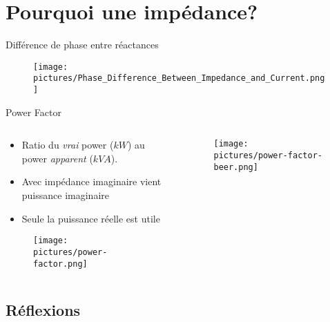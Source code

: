 
\section{Pourquoi une impédance?}

\begin{frame}{Différence de phase entre réactances}
    \begin{figure}
        \centering
        \texttt{[image: pictures/Phase\_Difference\_Between\_Impedance\_and\_Current.png]}
    \end{figure}
\end{frame}

\begin{frame}{Power Factor}
    \begin{columns}
        \begin{column}{0.5\textwidth}
            \begin{itemize}
                \item Ratio du \textit{vrai} power ($kW$) au power \textit{apparent} ($kVA$).
                \item Avec impédance imaginaire vient puissance imaginaire
                \item Seule la puissance réelle est utile
            \end{itemize}
            \begin{figure}
                \centering
                \texttt{[image: pictures/power-factor.png]}
            \end{figure}
        \end{column}
        \begin{column}{0.5\textwidth}
            \begin{figure}
                \centering
                \texttt{[image: pictures/power-factor-beer.png]}
            \end{figure}
        \end{column}
    \end{columns}
\end{frame}


\subsection{Réflexions}

